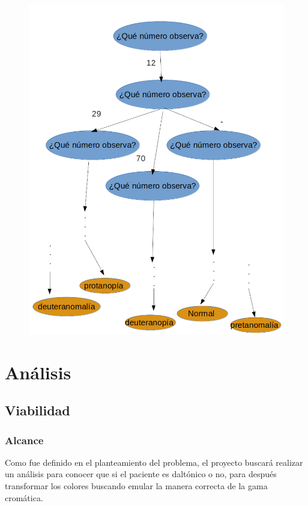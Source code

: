 \documentclass[10pt]{article}
\begin{document}
\begin{figure}[H]
	\begin{center}
\includegraphics[scale = 0.60]{Imagenes/arbol.png}
	\end{center} 
\end{figure}
\newpage
\section{Análisis}
\subsection{Viabilidad}

\subsubsection{Alcance}

Como fue definido en el planteamiento del problema, el proyecto buscará realizar un análisis para conocer que si el paciente es daltónico o no, para después transformar los colores buscando emular la manera correcta de la gama cromática.
\end{document}

